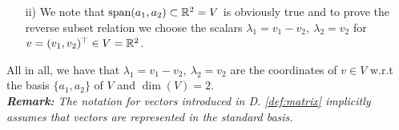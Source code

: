 \begin{frame}
{\begin{itemize}
\begin{itemize}
	$\lambda_2=v_2. $
	Inserting this into the top equation then yields
	$$\lambda_1+\lambda_2=v_1 ~~\Leftrightarrow~~\lambda_1+v_2=v_1~~\Leftrightarrow~~\lambda_1=v_1-v_2.$$
	Observe that $\lambda_1$ and $\lambda_2$ are uniquely determined, i.e., there are no other $\lambda_1$ and $\lambda_2$ solving the upper equations; thus $a_1,a_2$ are independent by Lemma \ref{lem:linear-independence}. Also, let us make a quick test:
	$$(v_1-v_2)a_1+v_2a_2 =\begin{pmatrix}v_1-v_2\\0\end{pmatrix}+\begin{pmatrix}v_2\\v_2\end{pmatrix}
	=\begin{pmatrix}v_1\\v_2\end{pmatrix}. $$
	\item[ii)] We note that $\text{span}(a_1,a_2) \subset {\mathbb{R}}^2 = V$ is obviously true and to prove the reverse subset relation we choose the scalars $\lambda_1=v_1-v_2,~\lambda_2=v_2$ for $v=(v_1,v_2)^\top \in V={\mathbb{R}}^2$.
\end{itemize}
		All in all, we have that $\lambda_1=v_1-v_2,~\lambda_2=v_2$ are the coordinates of $v \in V$ w.r.t the basis $\{a_1,a_2\}$ of $V$ and $\dim(V)=2$. \\
		\Vspace{0.1cm}
		\textit{\textbf{Remark:} The notation for vectors introduced in D. \ref{def:matrix} implicitly assumes that vectors are represented in the standard basis.} 
	\end{itemize}
}
\end{frame}



